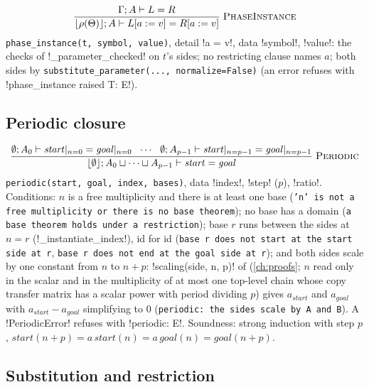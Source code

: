 \[
\frac{\Gamma;A\vdash L=R}{\lfloor\rho(\Theta)\rfloor;A\vdash L[a:=v]=R[a:=v]}\;\textsc{PhaseInstance}
\]
\texttt{phase\_\allowbreak{}instance(\allowbreak{}t,\allowbreak{} symbol,\allowbreak{} value)}, detail \code!a = v!, data \code!symbol!, \code!value!: the checks of \py!_parameter_checked! on $t$'s sides; no restricting clause names $a$; both sides by \texttt{substitute\_\allowbreak{}parameter(\allowbreak{}.\allowbreak{}.\allowbreak{}.\allowbreak{},\allowbreak{} normalize=False)} (an error refuses with \code!phase_instance raised T: E!).

\subsection{Periodic closure}

\[
\frac{\emptyset;A_0\vdash \mathit{start}|_{n=0}=\mathit{goal}|_{n=0}\ \ \cdots\ \ \emptyset;A_{p-1}\vdash \mathit{start}|_{n=p-1}=\mathit{goal}|_{n=p-1}}{\lfloor\emptyset\rfloor;A_0\sqcup\cdots\sqcup A_{p-1}\vdash \mathit{start}=\mathit{goal}}\;\textsc{Periodic}
\]
\texttt{periodic(\allowbreak{}start,\allowbreak{} goal,\allowbreak{} index,\allowbreak{} bases)}, data \code!index!, \code!step! ($p$), \code!ratio!. Conditions: $n$ is a free multiplicity and there is at least one base (\texttt{'n' is not a free multiplicity or there is no base theorem}); no base has a domain (\texttt{a base theorem holds under a restriction}); base $r$ runs between the sides at $n=r$ (\py!_instantiate_index!), id for id (\texttt{base r does not start at the start side at r}, \texttt{base r does not end at the goal side at r}); and both sides scale by one constant from $n$ to $n+p$: \py!scaling(side, n, p)! of  (\cref{ch:proofs}; $n$ read only in the scalar and in the multiplicity of at most one top-level chain whose copy transfer matrix has a scalar power with period dividing $p$) gives $a_{\mathit{start}}$ and $a_{\mathit{goal}}$ with $a_{\mathit{start}}-a_{\mathit{goal}}$ simplifying to $0$ (\texttt{periodic: the sides scale by A and B}). A \py!PeriodicError! refuses with \code!periodic: E!. Soundness: strong induction with step $p$, $\mathit{start}(n+p)=a\,\mathit{start}(n)=a\,\mathit{goal}(n)=\mathit{goal}(n+p)$.

\subsection{Substitution and restriction}

